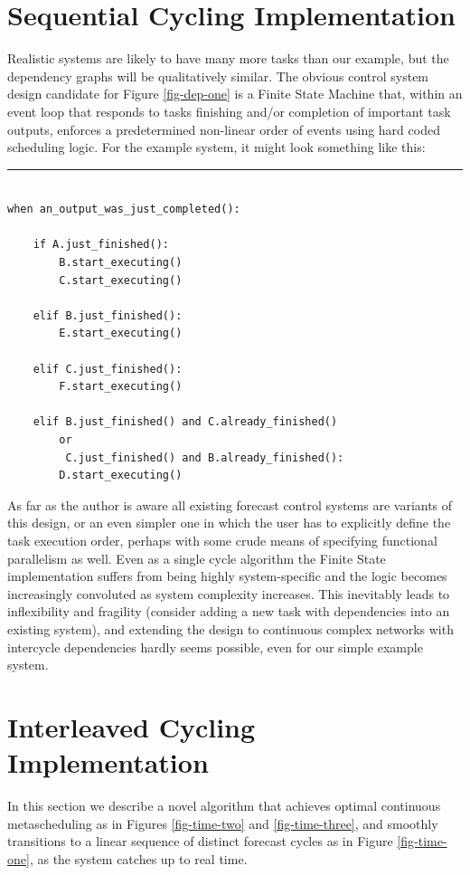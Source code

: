 \documentclass[11pt,a4paper]{article}
\begin{document}
\section{Sequential Cycling Implementation}

Realistic systems are likely to have many more tasks than our example,
but the dependency graphs will be qualitatively similar. The
obvious control system design candidate for Figure \ref{fig-dep-one}
is a Finite State Machine that, within an event loop that responds to 
tasks finishing and/or completion of important task outputs, enforces
a predetermined non-linear order of events using hard coded scheduling
logic.  For the example system, it might look something like this:

{\small
\noindent
\rule{5cm}{.2mm}
\begin{lstlisting} 

when an_output_was_just_completed():

    if A.just_finished():
        B.start_executing()
        C.start_executing()

    elif B.just_finished():
        E.start_executing()

    elif C.just_finished():
        F.start_executing()

    elif B.just_finished() and C.already_finished()
        or
         C.just_finished() and B.already_finished(): 
        D.start_executing()
\end{lstlisting}
}

As far as the author is aware all existing forecast control systems are
variants of this design, or an even simpler one in which the user has to
explicitly define the task execution order, perhaps with some crude
means of specifying functional parallelism as well. Even as a single
cycle algorithm the Finite State implementation suffers from being
highly system-specific and the logic becomes increasingly convoluted as
system complexity increases. This inevitably leads to inflexibility and
fragility (consider adding a new task with dependencies into an existing
system), and extending the design to continuous complex networks with
intercycle dependencies hardly seems possible, even for our simple
example system.


\section{Interleaved Cycling Implementation}

In this section we describe a novel algorithm that achieves optimal
continuous metascheduling as in Figures \ref{fig-time-two} and
\ref{fig-time-three}, and smoothly transitions to a linear sequence of
distinct forecast cycles as in Figure \ref{fig-time-one}, as the system
catches up to real time.  
\end{document}
